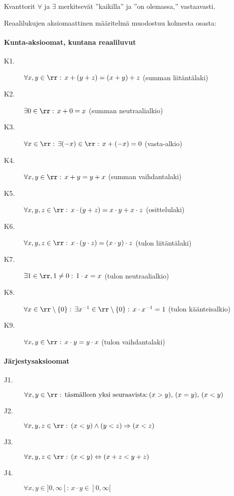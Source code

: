 Kvanttorit $\forall$ ja $\exists$ merkitsevät ''kaikilla'' ja ''on olemassa,'' vastaavasti.

Reaalilukujen aksiomaattinen määritelmä muodostuu kolmesta osasta:

\paragraph*{Kunta-aksioomat, kuntana reaaliluvut}
\begin{description}
\item[K1.] $\forall x, y \in \rr: \, x+(y+z) = (x+y)+z$ (summan liitäntälaki)
\item[K2.] $\exists 0 \in \rr: \, x+0 = x$ (summan neutraalialkio)
\item[K3.] $\forall x \in \rr: \, \exists (-x) \in \rr: \, x+(-x)=0$ (vasta-alkio)
\item[K4.] $\forall x, y \in \rr: \, x+y = y+x$ (summan vaihdantalaki)
\item[K5.] $\forall x, y, z \in \rr: \, x \cdot (y+z) = x \cdot y + x \cdot z$ (osittelulaki)
\item[K6.] $\forall x, y, z \in \rr: \, x \cdot (y \cdot z) = (x \cdot y) \cdot z$ (tulon liitäntälaki)
\item[K7.] $\exists 1 \in \rr, 1 \neq 0: \, 1 \cdot x = x$ (tulon neutraalialkio)
\item[K8.] $\forall x \in \rr \setminus \{0\}: \, \exists x^{-1} \in \rr \setminus \{0\}: \, x \cdot x^{-1}=1$ (tulon käänteisalkio)
\item[K9.] $\forall x, y \in \rr: \, x \cdot y = y \cdot x$ (tulon vaihdantalaki)
\end{description}

\paragraph*{Järjestysaksioomat}
\begin{description}
\item[J1.] $\forall x, y \in \rr: \, \text{täsmälleen yksi seuraavista:} \, (x > y), \, (x = y), \, (x < y)$
\item[J2.] $\forall x, y, z \in \rr: \, (x < y) \land (y < z) \Rightarrow (x < z)$
\item[J3.] $\forall x, y, z \in \rr: \, (x < y) \Leftrightarrow (x + z < y + z)$
\item[J4.] $\forall x, y \in ]0,\infty[: \, x \cdot y \in ]0,\infty[$
\end{description}

